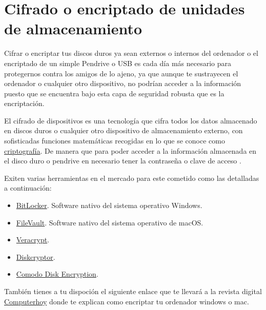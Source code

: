 \documentclass[
  spanish,
  a4paper,
  openany]{book}
\begin{document}
\hypertarget{cifrado-o-encriptado-de-unidades-de-almacenamiento}{%
\section{Cifrado o encriptado de unidades de almacenamiento}\label{cifrado-o-encriptado-de-unidades-de-almacenamiento}}

Cifrar o encriptar tus discos duros ya sean externos o internos del ordenador o el encriptado de un simple Pendrive o USB es cada día más necesario para protegernos contra los amigos de lo ajeno, ya que aunque te sustrayecen el ordenador o cualquier otro dispositivo, no podrían acceder a la información puesto que se encuentra bajo esta capa de seguridad robusta que es la encriptación.

El cifrado de dispositivos es una tecnología que cifra todos los datos almacenado en discos duros o cualquier otro dispositivo de almacenamiento externo, con sofisticadas funciones matemáticas recogidas en lo que se conoce como \href{https://es.wikipedia.org/wiki/Criptografía}{criptografía}. De manera que para poder acceder a la información almacenada en el disco duro o pendrive en necesario tener la contraseña o clave de acceso \citep{cifrado}.

Exiten varias herramientas en el mercado para este cometido como las detalladas a continuación:

\begin{itemize}
\item
  \href{https://docs.microsoft.com/es-es/windows/security/information-protection/bitlocker/bitlocker-overview}{BitLocker}. Software nativo del sistema operativo Windows.
\item
  \href{https://support.apple.com/es-es/HT204837}{FileVault}. Software nativo del sistema operativo de macOS.
\item
  \href{https://www.veracrypt.fr}{Veracrypt}.
\item
  \href{https://diskcryptor.org/}{Diskcryptor}.
\item
  \href{https://www.comodo.com/home/internet-security/disk-encryption.php}{Comodo Disk Encryption}.
\end{itemize}

También tienes a tu dispoción el siguiente enlace que te llevará a la revista digital \href{https://computerhoy.com/tutoriales/tecnologia/como-cifrar-disco-duro-memoria-externa-nadie-pueda-acceder-ella-386434}{Computerhoy} donde te explican como encriptar tu ordenador windows o mac.
\end{document}
